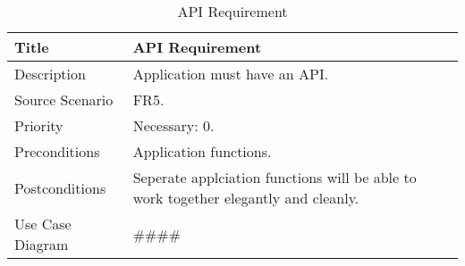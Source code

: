 \label{API Requirements}
\begin{table}[h!]
  \caption{API Requirement}
  \label{system-requirements/functional-requirements}
  \begin{tabularx}{\textwidth}{|l|X|}
    \hline
    Title            & API Requirement \\ \hline
    Description      & Application must have an API. \\ \hline
    Source Scenario  & FR5. \\ \hline
    Priority         & Necessary: 0. \\ \hline
    Preconditions    & Application functions. \\ \hline
    Postconditions   & Seperate applciation functions will be able to work 
                       together elegantly and cleanly. \\ \hline
    Use Case Diagram & #### \\ \hline
  \end{tabularx}
\end{table}